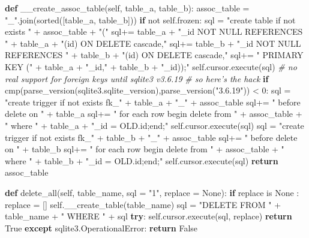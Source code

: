 \documentclass[]{article}
\newenvironment{Shaded}{}{}
\newcommand{\KeywordTok}[1]{\textcolor[rgb]{0.00,0.44,0.13}{\textbf{{#1}}}}
\newcommand{\DataTypeTok}[1]{\textcolor[rgb]{0.56,0.13,0.00}{{#1}}}
\newcommand{\DecValTok}[1]{\textcolor[rgb]{0.25,0.63,0.44}{{#1}}}
\newcommand{\StringTok}[1]{\textcolor[rgb]{0.25,0.44,0.63}{{#1}}}
\newcommand{\CommentTok}[1]{\textcolor[rgb]{0.38,0.63,0.69}{\textit{{#1}}}}
\newcommand{\OtherTok}[1]{\textcolor[rgb]{0.00,0.44,0.13}{{#1}}}
\newcommand{\NormalTok}[1]{{#1}}
\begin{document}
\begin{Shaded}
\begin{Highlighting}[]
    \KeywordTok{def} \NormalTok{__create_assoc_table(}\OtherTok{self}\NormalTok{, table_a, table_b):}
        \NormalTok{assoc_table = }\StringTok{"_"}\NormalTok{.join(}\DataTypeTok{sorted}\NormalTok{([table_a, table_b]))}
        \KeywordTok{if} \NormalTok{not }\OtherTok{self}\NormalTok{.frozen:}
            \NormalTok{sql = }\StringTok{"create table if not exists "} \NormalTok{+ assoc_table + }\StringTok{"("}
            \NormalTok{sql+= table_a + }\StringTok{"_id NOT NULL REFERENCES "} \NormalTok{+ table_a + }\StringTok{"(id) ON DELETE cascade,"}
            \NormalTok{sql+= table_b + }\StringTok{"_id NOT NULL REFERENCES "} \NormalTok{+ table_b + }\StringTok{"(id) ON DELETE cascade,"}
            \NormalTok{sql+= }\StringTok{" PRIMARY KEY ("} \NormalTok{+ table_a + }\StringTok{"_id,"} \NormalTok{+ table_b + }\StringTok{"_id));"}
            \OtherTok{self}\NormalTok{.cursor.execute(sql)}
            \CommentTok{# no real support for foreign keys until sqlite3 v3.6.19}
            \CommentTok{# so here's the hack}
            \KeywordTok{if} \DataTypeTok{cmp}\NormalTok{(parse_version(sqlite3.sqlite_version),parse_version(}\StringTok{"3.6.19"}\NormalTok{)) < }\DecValTok{0}\NormalTok{:}
                \NormalTok{sql = }\StringTok{"create trigger if not exists fk_"} \NormalTok{+ table_a + }\StringTok{"_"} \NormalTok{+ assoc_table}
                \NormalTok{sql+= }\StringTok{" before delete on "} \NormalTok{+ table_a}
                \NormalTok{sql+= }\StringTok{" for each row begin delete from "} \NormalTok{+ assoc_table + }\StringTok{" where "} \NormalTok{+ table_a + }\StringTok{"_id = OLD.id;end;"}
                \OtherTok{self}\NormalTok{.cursor.execute(sql)}
                \NormalTok{sql = }\StringTok{"create trigger if not exists fk_"} \NormalTok{+ table_b + }\StringTok{"_"} \NormalTok{+ assoc_table}
                \NormalTok{sql+= }\StringTok{" before delete on "} \NormalTok{+ table_b}
                \NormalTok{sql+= }\StringTok{" for each row begin delete from "} \NormalTok{+ assoc_table + }\StringTok{" where "} \NormalTok{+ table_b + }\StringTok{"_id = OLD.id;end;"}
                \OtherTok{self}\NormalTok{.cursor.execute(sql)}
        \KeywordTok{return} \NormalTok{assoc_table}

    \KeywordTok{def} \NormalTok{delete_all(}\OtherTok{self}\NormalTok{, table_name, sql = }\StringTok{"1"}\NormalTok{, replace = }\OtherTok{None}\NormalTok{):}
        \KeywordTok{if} \NormalTok{replace is }\OtherTok{None} \NormalTok{: replace = []}
        \OtherTok{self}\NormalTok{.__create_table(table_name)}
        \NormalTok{sql = }\StringTok{"DELETE FROM "} \NormalTok{+ table_name + }\StringTok{" WHERE "} \NormalTok{+ sql}
        \KeywordTok{try}\NormalTok{:}
            \OtherTok{self}\NormalTok{.cursor.execute(sql, replace)}
            \KeywordTok{return} \OtherTok{True}
        \KeywordTok{except} \NormalTok{sqlite3.OperationalError:}
            \KeywordTok{return} \OtherTok{False}


\end{Highlighting}
\end{Shaded}
\end{document}
